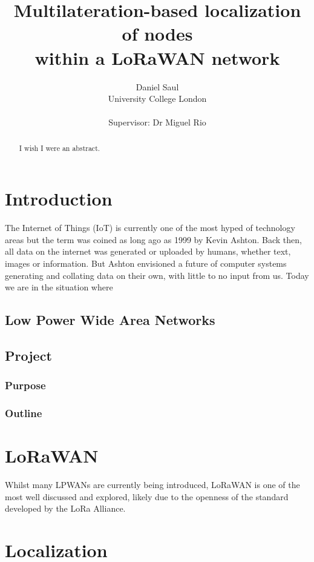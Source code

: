 \documentclass[a4paper]{report}
\title{Multilateration-based localization of nodes\\within a LoRaWAN network}
\author{Daniel Saul\\University College London\\ \\Supervisor: Dr Miguel Rio}
\begin{document}
    \maketitle

\pagestyle{fancy}

\begin{abstract}
    I wish I were an abstract.
\end{abstract}

\tableofcontents


\chapter{Introduction}

  The Internet of Things (IoT) is currently one of the most hyped of technology areas but the term was coined as long ago as 1999 by Kevin Ashton. Back then, all data on the internet was generated or uploaded by humans, whether text, images or information. But Ashton envisioned a future of computer systems generating and collating data on their own, with little to no input from us. Today we are in the situation where

  \section{Low Power Wide Area Networks}

  \section{Project}
    \subsection{Purpose}

    \subsection{Outline}

\chapter{LoRaWAN}

  Whilst many LPWANs are currently being introduced, LoRaWAN is one of the most well discussed and explored, likely due to the openness of the standard developed by the LoRa Alliance.

\chapter{Localization}
\end{document}
